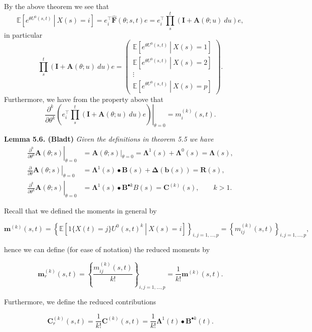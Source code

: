 \documentclass[
]{book}
\begin{document}
By the above theorem we see that
\[
\mathbb E\left[\left.e^{\theta U^0(s,t)}\ \right\vert\ X(s)=i\right] =e_i^\top\hat{\mathbf F}(\theta; s,t)e = e_i^\top\prod_s^t(\mathbf I + \mathbf A(\theta; u)\ du)e,
\]
in particular
\[
\prod_s^t(\mathbf I + \mathbf A(\theta; u)\ du)e=
\begin{pmatrix}
\mathbb E\left[\left.e^{\theta U^0(s,t)}\ \right\vert\ X(s)=1\right]\\
\mathbb E\left[\left.e^{\theta U^0(s,t)}\ \right\vert\ X(s)=2\right]\\
\vdots\\
\mathbb E\left[\left.e^{\theta U^0(s,t)}\ \right\vert\ X(s)=p\right]
\end{pmatrix}.
\]
Furthermore, we have from the property above that
\[
\left.\frac{\partial^k}{\partial \theta^k}\left(e_i^\top\prod_s^t(\mathbf I + \mathbf A(\theta; u)\ du)e\right)\right\vert_{\theta = 0}=m^{(k)}_{i}(s,t).
\]

\textbf{Lemma 5.6. (Bladt)} \emph{Given the definitions in theorem 5.5 we have}
\begin{align*}
\left.\frac{\partial^0}{\partial \theta^0}\mathbf A(\theta; s)\right\vert_{\theta=0}&=\mathbf A(\theta; s)\Big\vert_{\theta=0}=\mathbf \Lambda^1(s)+\mathbf\Lambda^0(s)=\mathbf\Lambda(s),\\
\left.\frac{\partial}{\partial \theta}\mathbf A(\theta; s)\right\vert_{\theta=0}&=\mathbf \Lambda^1(s)\bullet \mathbf B(s)+\mathbf \Delta(\mathbf b(s))=\mathbf R(s),\\
\left.\frac{\partial^k}{\partial \theta^k}\mathbf A(\theta; s)\right\vert_{\theta=0}&=\mathbf \Lambda^1(s)\bullet \mathbf B^{\bullet k} B(s)=\mathbf C^{(k)}(s),\qquad k>1.
\end{align*}

Recall that we defined the moments in general by

\[
\mathbf m^{(k)}(s,t)=\left\{\mathbb E\left[\left. 1\{X(t)=j\}U^0(s,t)^k\ \right\vert\ X(s)=i\right]\right\}_{i,j=1,...,p}=\left\{m^{(k)}_{ij}(s,t)\right\}_{i,j=1,...,p},
\]

hence we can define (for ease of notation) the reduced moments by

\[
\mathbf m_r^{(k)}(s,t)=\left\{\frac{m^{(k)}_{ij}(s,t)}{k!}\right\}_{i,j=1,...,p}=\frac{1}{k!}\mathbf m^{(k)}(s,t).
\]

Furthermore, we define the reduced contributions

\[
\mathbf C^{(k)}_r(s,t)=\frac{1}{k!}\mathbf C^{(k)}(s,t)=\frac{1}{k!}\mathbf \Lambda^1(t)\bullet \mathbf B^{\bullet k}(t).
\]
\end{document}

